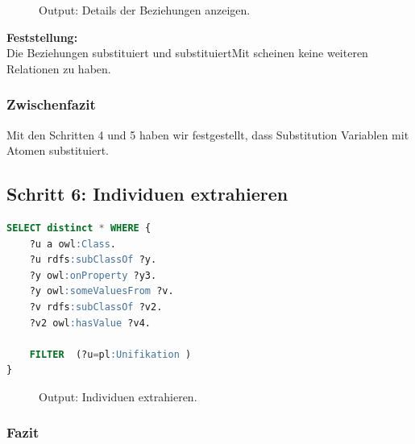 \begin{figure}[H]
\centering {}
\caption{Output: Details der Beziehungen anzeigen.\label{fig:prolog_5}\protect\footnotemark}
\end{figure}

\textbf{Feststellung:}\\ Die Beziehungen substituiert und substituiertMit scheinen keine weiteren Relationen zu haben. 

\subsubsection{Zwischenfazit}
\label{sssec:anh_beispiel_c_5_1}

Mit den Schritten 4 und 5 haben wir festgestellt, dass Substitution Variablen mit Atomen substituiert.

\subsection{Schritt 6: Individuen extrahieren}
\label{ssec:anh_beispiel_c_6}

\begin{lstlisting}[caption={Individuen extrahieren},captionpos=b,language=SQL]
SELECT distinct * WHERE { 
	?u a owl:Class.
	?u rdfs:subClassOf ?y.
	?y owl:onProperty ?y3.	
	?y owl:someValuesFrom ?v.
	?v rdfs:subClassOf ?v2.
	?v2 owl:hasValue ?v4.
	
	FILTER  (?u=pl:Unifikation )
}


\end{lstlisting}

\begin{figure}[H]
\centering {}
\caption{Output: Individuen extrahieren.\label{fig:prolog_6}\protect\footnotemark}
\end{figure}

\subsubsection{Fazit}
\label{sssec:anh_beispiel_c_6_1}


